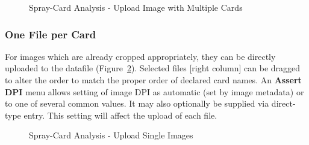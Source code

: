 \documentclass[10pt,letterpaper,titlepage]{article}
\begin{document}
    \begin{figure}[hb]
        \centering
        \caption{Spray-Card Analysis - Upload Image with Multiple Cards}
        \label{fig:card_upload_multiple}
    \end{figure}
    \FloatBarrier

    \subsubsection{One File per Card}
    For images which are already cropped appropriately, they can be directly uploaded to the datafile (Figure~\ref{fig:card_upload_singles}). Selected files [right column] can be dragged to alter the order to match the proper order of declared card names. An \textbf{Assert DPI} menu allows setting of image DPI as automatic (set by image metadata) or to one of several common values. It may also optionally be supplied via direct-type entry. This setting will affect the upload of each file.
    \begin{figure}[hb]
        \centering
        \caption{Spray-Card Analysis - Upload Single Images}
        \label{fig:card_upload_singles}
    \end{figure}
    \FloatBarrier
\end{document}
